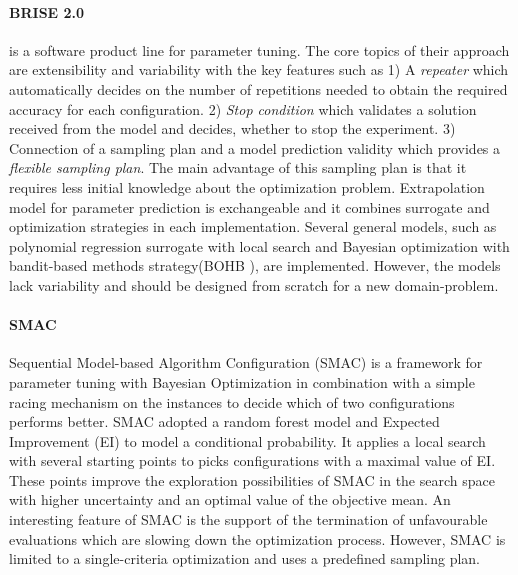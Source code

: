         \paragraph{BRISE 2.0} \cite{Pukhkaiev19} is a software product line for parameter tuning. The core topics of their approach are extensibility and variability with the key features such as 1) A \emph{repeater} which automatically decides on the number of repetitions needed to obtain the required accuracy for each configuration. 2) \emph{Stop condition} which validates a solution received from the model and decides, whether to stop the experiment. 3) Connection of a sampling plan and a model prediction validity which provides a \emph{flexible sampling plan}. The main advantage of this sampling plan is that it requires less initial knowledge about the optimization problem.
        Extrapolation model for parameter prediction is exchangeable and it combines surrogate and optimization strategies in each implementation. Several general models, such as polynomial regression surrogate with local search and Bayesian optimization with bandit-based methods strategy(BOHB \cite{FalknerBOHB}), are implemented.  However, the models lack variability and should be designed from scratch for a new domain-problem.

        \paragraph{SMAC} Sequential Model-based Algorithm Configuration (SMAC)\cite{HutterHL11, smac-2017} is a framework for parameter tuning with Bayesian Optimization in combination with a simple racing mechanism on the instances to decide which of two configurations performs better.
        SMAC adopted a random forest model and Expected Improvement (EI) to model a conditional probability. It applies a local search with several starting points to picks configurations with a maximal value of EI. These points improve the exploration possibilities of SMAC in the search space with higher uncertainty and an optimal value of the objective mean. 
        An interesting feature of SMAC is the support of the termination of unfavourable evaluations which are slowing down the optimization process. However, SMAC is limited to a single-criteria optimization and uses a predefined sampling plan.

